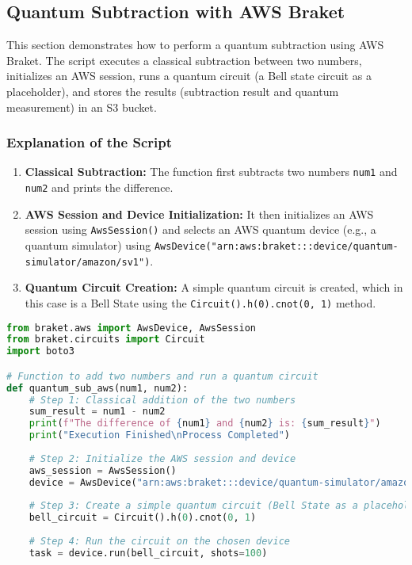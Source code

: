 \documentclass[conference]{IEEEtran}
\begin{document}
\subsection{Quantum Subtraction with AWS Braket}

This section demonstrates how to perform a quantum subtraction using AWS Braket. The script executes a classical subtraction between two numbers, initializes an AWS session, runs a quantum circuit (a Bell state circuit as a placeholder), and stores the results (subtraction result and quantum measurement) in an S3 bucket.

\subsubsection{Explanation of the Script}
\begin{enumerate}
    \item \textbf{Classical Subtraction:} The function first subtracts two numbers \texttt{num1} and \texttt{num2} and prints the difference.
    
    \item \textbf{AWS Session and Device Initialization:} It then initializes an AWS session using \texttt{AwsSession()} and selects an AWS quantum device (e.g., a quantum simulator) using \texttt{AwsDevice("arn:aws:braket:::device/quantum-simulator/amazon/sv1")}.
    
    \item \textbf{Quantum Circuit Creation:} A simple quantum circuit is created, which in this case is a Bell State using the \texttt{Circuit().h(0).cnot(0, 1)} method.
    

\end{enumerate}

\begin{tcolorbox}[title=aws\_quantum\_subtraction.py Script, colback=gray!5!white, colframe=blue!75!black]
\begin{lstlisting}[language=Python]
from braket.aws import AwsDevice, AwsSession
from braket.circuits import Circuit
import boto3

# Function to add two numbers and run a quantum circuit
def quantum_sub_aws(num1, num2):
    # Step 1: Classical addition of the two numbers
    sum_result = num1 - num2
    print(f"The difference of {num1} and {num2} is: {sum_result}")
    print("Execution Finished\nProcess Completed")
    
    # Step 2: Initialize the AWS session and device
    aws_session = AwsSession()
    device = AwsDevice("arn:aws:braket:::device/quantum-simulator/amazon/sv1")
    
    # Step 3: Create a simple quantum circuit (Bell State as a placeholder)
    bell_circuit = Circuit().h(0).cnot(0, 1)
    
    # Step 4: Run the circuit on the chosen device
    task = device.run(bell_circuit, shots=100)
\end{lstlisting}
\end{tcolorbox}
\end{document}
